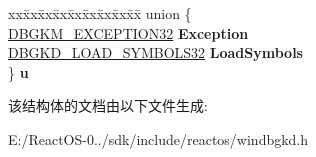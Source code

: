 \begin{DoxyCompactItemize}
\item 
\mbox{\label{struct___d_b_g_k_d___w_a_i_t___s_t_a_t_e___c_h_a_n_g_e32_a57b2d4abcebde41fc517b17984d1cd1e}} 
\begin{tabbing}
xx\=xx\=xx\=xx\=xx\=xx\=xx\=xx\=xx\=\kill
union \{\\
\>\hyperlink{struct___d_b_g_k_m___e_x_c_e_p_t_i_o_n32}{DBGKM\_EXCEPTION32} {\bfseries Exception}\\
\>\hyperlink{struct___d_b_g_k_d___l_o_a_d___s_y_m_b_o_l_s32}{DBGKD\_LOAD\_SYMBOLS32} {\bfseries LoadSymbols}\\
\} {\bfseries u}\\

\end{tabbing}\end{DoxyCompactItemize}


该结构体的文档由以下文件生成\+:\begin{DoxyCompactItemize}
\item 
E\+:/\+React\+O\+S-\/0../sdk/include/reactos/windbgkd.\+h\end{DoxyCompactItemize}

